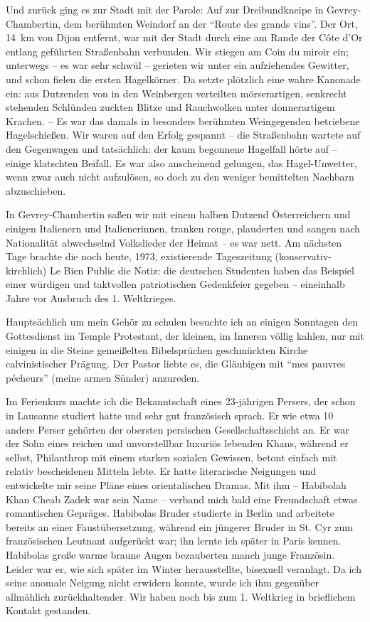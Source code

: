 Und zurück ging es zur Stadt mit der Parole: Auf zur Dreibundkneipe in Gevrey-Chambertin, dem berühmten Weindorf an der \enquote{Route des grands vins}. Der Ort, 14~km von Dijon entfernt, war mit der Stadt durch eine am Rande der Côte d'Or entlang geführten Straßenbahn verbunden. Wir stiegen am Coin du miroir ein; unterwegs -- es war sehr schwül -- gerieten wir unter ein aufziehendes Gewitter, und schon fielen die ersten Hagelkörner. Da setzte plötzlich eine wahre Kanonade ein: aus Dutzenden von in den Weinbergen verteilten mörserartigen, senkrecht stehenden Schlünden zuckten Blitze und Rauchwolken unter donnerartigem Krachen. -- Es war das damals in besonders berühmten Weingegenden betriebene Hagelschießen. Wir waren auf den Erfolg gespannt -- die Straßenbahn wartete auf den Gegenwagen und tatsächlich: der kaum begonnene Hagelfall hörte auf -- einige klatschten Beifall. Es war also anscheinend gelungen, das Hagel-Unwetter, wenn zwar auch nicht aufzulösen, so doch zu den weniger bemittelten Nachbarn abzuschieben.

In Gevrey-Chambertin saßen wir mit einem halben Dutzend Österreichern und einigen Italienern und Italienerinnen, tranken rouge, plauderten und sangen nach Nationalität abwechselnd Volkslieder der Heimat -- es war nett.
Am nächsten Tage brachte die noch heute, 1973, existierende Tageszeitung (konservativ-kirchlich) Le Bien Public die Notiz: die deutschen Studenten haben das Beispiel einer würdigen und taktvollen patriotischen Gedenkfeier gegeben -- eineinhalb Jahre vor Ausbruch des 1. Weltkrieges.

Hauptsächlich um mein Gehör zu schulen besuchte ich an einigen Sonntagen den Gottesdienst im Temple Protestant, der kleinen, im Inneren völlig kahlen, nur mit einigen in die Steine gemeißelten Bibelsprüchen geschmückten Kirche calvinistischer Prägung. Der Pastor liebte es, die Gläubigen mit \enquote{mes pauvres pécheurs} (meine armen Sünder) anzureden.

Im Ferienkurs machte ich die Bekanntschaft eines 23-jährigen Persers, der schon in Lausanne studiert hatte und sehr gut französisch sprach. Er wie etwa 10 andere Perser gehörten der obersten persischen Gesellschaftsschicht an. Er war der Sohn eines reichen und unvorstellbar luxuriös lebenden Khans, während er selbst, Philanthrop mit einem starken sozialen Gewissen, betont einfach mit relativ bescheidenen Mitteln lebte. Er hatte literarische Neigungen und entwickelte mir seine Pläne eines orientalischen Dramas. Mit ihm -- Habibolah Khan Cheab Zadek war sein Name -- verband mich bald eine Freundschaft etwas romantischen Gepräges. Habibolas Bruder studierte in Berlin und arbeitete bereits an einer Faustübersetzung, während ein jüngerer Bruder in St. Cyr zum französischen Leutnant aufgerückt war; ihn lernte ich später in Paris kennen. Habibolas große warme braune Augen bezauberten manch junge Französin. Leider war er, wie sich später im Winter herausstellte, bisexuell veranlagt. Da ich seine anomale Neigung nicht erwidern konnte, wurde ich ihm gegenüber allmählich zurückhaltender. Wir haben noch bis zum 1. Weltkrieg in brieflichem Kontakt gestanden.

